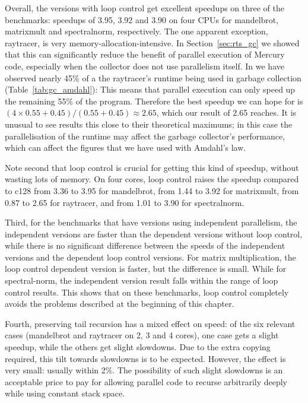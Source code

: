 Overall, the versions with loop control
get excellent speedups on three of the benchmarks:
speedups of 3.95, 3.92 and 3.90 on four CPUs
for mandelbrot, matrixmult and spectralnorm, respectively.
The one apparent exception, raytracer,
is very memory-allocation-intensive.
In Section~\ref{sec:rts_gc} we showed that this can significantly reduce the
benefit of parallel execution of Mercury code,
especially when the collector does not use parallelism itself.
In we have observed nearly 45\% of a the raytracer's
runtime being used in garbage collection (Table~\ref{tab:gc_amdahl}):
This means that parallel execution can only speed up the remaining 55\% of
the program.
Therefore the best speedup we can hope for is
$(4 \times 0.55 + 0.45)/(0.55 + 0.45) \approx 2.65$,
which our result of 2.65 reaches.
It is unusual to see results this close to their theoretical maximums;
in this case the parallelisation of the runtime may affect the garbage
collector's performance,
which can affect the figures that we have used with Amdahl's law.

Note second that
loop control is crucial for getting this kind of speedup,
without wasting lots of memory.
On four cores, loop control raises the speedup compared to c128
from 3.36 to 3.95 for mandelbrot,
from 1.44 to 3.92 for matrixmult,
from 0.87 to 2.65 for raytracer,
and from 1.01 to 3.90 for spectralnorm.

Third, for the benchmarks that have versions using independent parallelism,
the independent versions are faster than
the dependent versions without loop control,
while there is no significant difference between
the speeds of the independent versions and the dependent loop control versions.
For matrix multiplication, the loop control dependent version is faster,
but the difference is small.
While for spectral-norm, the independent version result falls within the
    range of loop control results.
This shows that on these benchmarks, loop control completely avoids
the problems described at the beginning of this chapter.

Fourth, preserving tail recursion has a mixed effect on speed:
of the six relevant cases (mandelbrot and raytracer on 2, 3 and 4 cores),
one case gets a slight speedup, while the others get slight slowdowns.
Due to the extra copying required,
this tilt towards slowdowns is to be expected.
However, the effect is very small:
usually within 2\%.
The possibility of such slight slowdowns is an acceptable price to pay
for allowing parallel code to recurse arbitrarily deeply
while using constant stack space.


